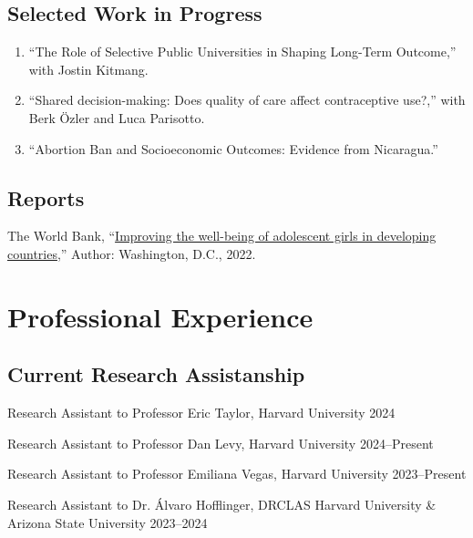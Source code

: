 \documentclass[a4paper,10pt]{article}
\renewenvironment{itemize}{
  \begin{list}{}
    { \setlength{\itemsep}{5pt}
      \setlength{\parsep}{0pt}
      \setlength{\topsep}{0pt}
      \setlength{\leftmargin}{0em} } }{
  \end{list}}
\begin{document}
\subsection*{Selected Work in Progress}

\begin{enumerate}[leftmargin=10pt, label={}, itemindent=-10pt, nosep]
\item ``The Role of Selective Public Universities in Shaping Long-Term
Outcome,'' with Jostin Kitmang. 
\item ``Shared decision-making: Does quality of care affect contraceptive
use?,'' with Berk Özler and Luca Parisotto.
  \item ``Abortion Ban and Socioeconomic Outcomes: Evidence from Nicaragua.''
\end{enumerate}

\subsection*{Reports}

\begin{itemize}
\item The World Bank,
``\href{https://documents1.worldbank.org/curated/en/099025312242111019/pdf/P1699940bcc13001a083820804f74e8151b.pdf}{Improving
the well-being of adolescent girls in developing countries},'' Author:
Washington, D.C., 2022. 
\end{itemize}


\section*{Professional Experience}

\subsection*{Current Research Assistanship}

\begin{itemize}
  \item Research Assistant to Professor Eric Taylor, Harvard University 
  \hfill 2024 
  \item Research Assistant to Professor Dan Levy, Harvard University
  \hfill 2024--Present
  \item Research Assistant to Professor Emiliana Vegas, Harvard University
  \hfill 2023--Present
  \item Research Assistant to Dr. Álvaro Hofflinger, DRCLAS Harvard University
  \& Arizona State University
  \hfill 2023--2024
\end{itemize}
\end{document}

